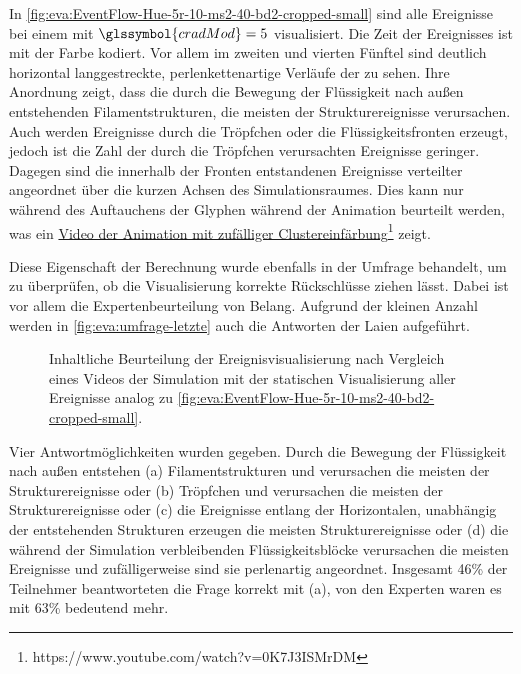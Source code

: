In \autoref{fig:eva:EventFlow-Hue-5r-10-ms2-40-bd2-cropped-small} sind alle Ereignisse bei einem   mit $\glssymbol{cradMod} = 5$ visualisiert. Die Zeit der Ereignisses ist mit der Farbe kodiert. Vor allem im zweiten und vierten Fünftel sind deutlich horizontal langgestreckte, perlenkettenartige Verläufe der  zu sehen. Ihre Anordnung zeigt, dass die durch die Bewegung der Flüssigkeit nach außen entstehenden Filamentstrukturen, die meisten der Strukturereignisse verursachen. Auch werden Ereignisse durch die Tröpfchen oder die Flüssigkeitsfronten erzeugt, jedoch ist die Zahl der durch die Tröpfchen verursachten Ereignisse geringer. Dagegen sind die innerhalb der Fronten entstandenen Ereignisse verteilter angeordnet über die kurzen Achsen des Simulationsraumes. Dies kann nur während des Auftauchens der Glyphen während der Animation beurteilt werden, was ein \href{https://www.youtube.com/watch?v=0K7J3ISMrDM}{Video der Animation mit zufälliger Clustereinfärbung}\footnote{https://www.youtube.com/watch?v=0K7J3ISMrDM} zeigt.

Diese Eigenschaft der Berechnung wurde ebenfalls in der Umfrage behandelt, um zu überprüfen, ob die Visualisierung korrekte Rückschlüsse ziehen lässt. Dabei ist vor allem die Expertenbeurteilung von Belang. Aufgrund der kleinen Anzahl werden in \autoref{fig:eva:umfrage-letzte} auch die Antworten der Laien aufgeführt.

\begin{figure}
	{\caption{Inhaltliche Beurteilung der Ereignisvisualisierung nach Vergleich eines Videos der Simulation mit der statischen Visualisierung aller Ereignisse analog zu \autoref{fig:eva:EventFlow-Hue-5r-10-ms2-40-bd2-cropped-small}.}\label{fig:eva:umfrage-letzte}}
\end{figure}

Vier Antwortmöglichkeiten wurden gegeben. Durch die Bewegung der Flüssigkeit nach außen entstehen (a) Filamentstrukturen und verursachen die meisten der Strukturereignisse oder (b) Tröpfchen und verursachen die meisten der Strukturereignisse oder (c) die Ereignisse entlang der Horizontalen, unabhängig der entstehenden Strukturen erzeugen die meisten Strukturereignisse oder (d) die während der Simulation verbleibenden Flüssigkeitsblöcke verursachen die meisten Ereignisse und zufälligerweise sind sie perlenartig angeordnet. Insgesamt 46\% der Teilnehmer beantworteten die Frage korrekt mit (a), von den Experten waren es mit 63\% bedeutend mehr.

